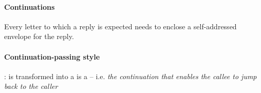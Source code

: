 \documentclass{memo}
\begin{document}
\small
{}

\paragraph{Continuations}
\bit
\w Every letter to which a reply is expected needs to enclose a self-addressed
envelope for the reply.
\eit

\paragraph{Continuation-passing style}
\bit
\w {}:  is transformed into a  
   \bit
    is a  -- i.e. {\em the continuation that
     enables the callee to jump back to the caller}
   \w 
   \eit
\eit
\end{document}
